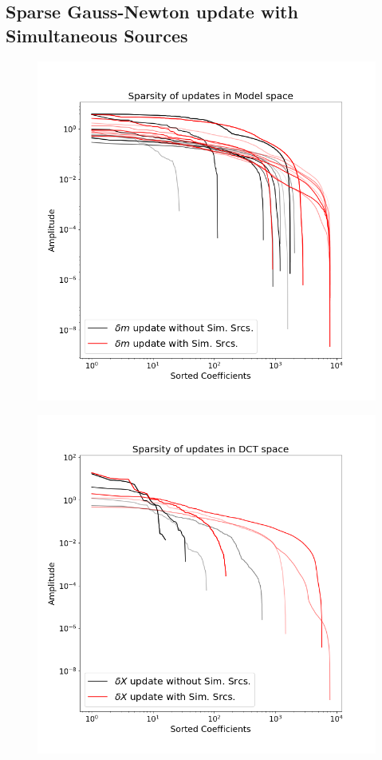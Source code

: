 \documentclass[twoside]{article}
\begin{document}
\subsection{Sparse Gauss-Newton update with Simultaneous Sources}

\begin{figure}[!ht]
\centering
\begin{minipage}{.31\textwidth}
  \centering
  \includegraphics[width=.99\linewidth]{figures/SimSrc_kills_Sparsity_Id.png}
  \label{Sparsity_ID}
\end{minipage}
\begin{minipage}{.31\textwidth}
  \centering
  \includegraphics[width=.99\linewidth]{figures/SimSrc_kills_Sparsity_DCT.png}

\end{minipage}
\end{figure}
\end{document}
